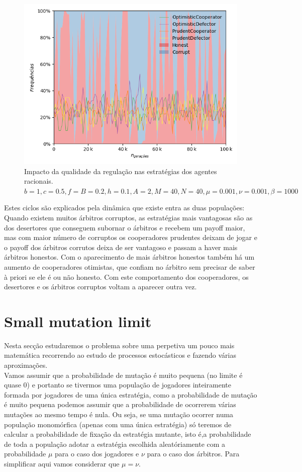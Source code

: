 \documentclass[conference, twocolumn]{IEEEtran}
\theoremstyle{plain}
\theoremstyle{definition}
\theoremstyle{remark}
\begin{document}
    \begin{figure}[h]
        \centering
        \includegraphics[width=1\linewidth]{images/Comparison.png}
        \caption{\small Impacto da qualidade da regulação nas estratégias dos agentes racionais. $b=1, c=0.5, f=B=0.2, h=0.1, A=2, M=40, N=40, \mu=0.001, \nu=0.001, \beta=1000$}
        \label{fig:ciclos}
    \end{figure}
    Estes ciclos são explicados pela dinâmica que existe entra as duas populações: Quando existem muitos árbitros corruptos, as estratégias mais vantagosas são as dos desertores que conseguem subornar o árbitros e recebem um payoff maior, mas com maior número de corruptos os cooperadores prudentes deixam de jogar e o payoff dos árbitros corrutos deixa de ser vantagoso e passam a haver mais árbitros honestos. Com o aparecimento de mais árbitros honestos também há um aumento de cooperadores otimistas, que confiam no árbitro sem precisar de saber à priori se ele é ou não honesto. Com este comportamento dos cooperadores, os desertores e os árbitros corruptos voltam a aparecer outra vez. \\

    \section{Small mutation limit}
    Nesta secção estudaremos o problema sobre uma perpetiva um pouco mais matemática recorrendo ao estudo de processos estocásticos e fazendo várias aproximações.\\
    Vamos assumir que a probabilidade de mutação é muito pequena (no limite é quase 0) e portanto se tivermos uma população de jogadores inteiramente formada por jogadores de uma única estratégia, como a probabilidade de mutação é muito pequena podemos assumir que a probabilidade de ocorrerem várias mutações ao mesmo tempo é nula. Ou seja, se uma mutação ocorrer numa população monomórfica (apenas com uma única estratégia) só teremos de calcular a probabilidade de fixação \cite{2} da estratégia mutante, isto é,a probabilidade de toda a população adotar a estratégia escolhida aleatóriamente com a probabilidade $\mu$ para o caso dos jogadores e $\nu$ para o caso dos árbitros. Para simplificar aqui vamos considerar que $\mu=\nu$.
\end{document}
